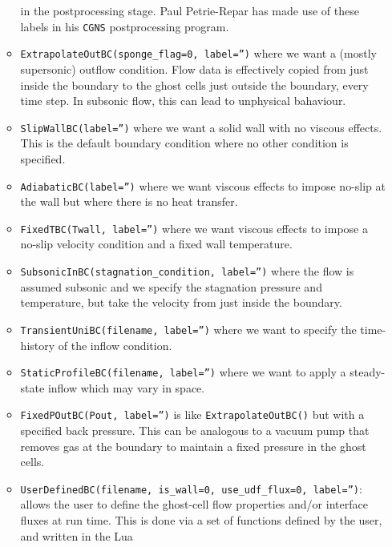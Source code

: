 \documentclass[12pt,a4paper,twoside]{article}
\begin{document}
\begin{itemize}
\begin{itemize}
      in the postprocessing stage.
      Paul Petrie-Repar has made use of these labels in his \texttt{CGNS} postprocessing program.
    \item \texttt{ExtrapolateOutBC(sponge\_flag=0, label='')} where we want a (mostly supersonic) outflow
      condition.
      Flow data is effectively copied from just inside the boundary to the ghost cells
      just outside the boundary, every time step.
      In subsonic flow, this can lead to unphysical bahaviour.
    \item \texttt{SlipWallBC(label='')} where we want a solid wall with no viscous effects.
      This is the default boundary condition where no other condition is specified.
    \item \texttt{AdiabaticBC(label='')} where we want viscous effects to impose no-slip at the wall
      but where there is no heat transfer.
    \item \texttt{FixedTBC(Twall, label='')} where we want viscous effects to impose a no-slip velocity 
      condition and a fixed wall temperature.
    \item \texttt{SubsonicInBC(stagnation\_condition, label='')} where the flow is assumed subsonic and
      we specify the stagnation pressure and temperature, but take the velocity from just inside
      the boundary.
    \item \texttt{TransientUniBC(filename, label='')} where we want to specify the time-history of
      the inflow condition.
    \item \texttt{StaticProfileBC(filename, label='')} where we want to apply a steady-state inflow
       which may vary in space.
    \item \texttt{FixedPOutBC(Pout, label='')} is like \texttt{ExtrapolateOutBC()} but with a specified 
      back pressure.
      This can be analogous to a vacuum pump that removes gas at the boundary to maintain
      a fixed pressure in the ghost cells.
    \item \texttt{UserDefinedBC(filename, is\_wall=0, use\_udf\_flux=0, label='')}: 
       allows the user to define the ghost-cell flow properties and/or interface fluxes at run time.
       This is done via a set of functions defined by the user, and written in the Lua

\end{itemize}
\end{itemize}
\end{document}
